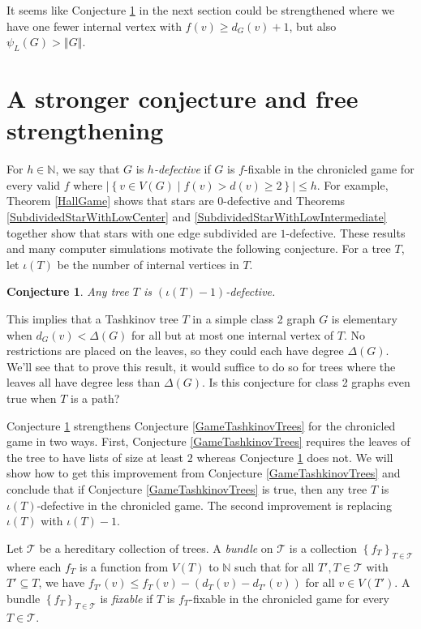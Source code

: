 \documentclass[12pt,reqno]{amsart}
\theoremstyle{plain}
\newtheorem{conj}[thm]{Conjecture}
\theoremstyle{definition}
\theoremstyle{remark}
\newcommand{\fancy}[1]{\mathcal{#1}}
\newcommand{\IN}{\mathbb{N}}
\newcommand{\set}[1]{\left\{ #1 \right\}}
\newcommand{\setb}[3]{\left\{ #1 \in #2 \mid #3 \right\}}
\newcommand{\card}[1]{\left|#1\right|}
\newcommand{\size}[1]{\left\Vert#1\right\Vert}
\newcommand{\parens}[1]{\left( #1 \right)}
\newcommand{\T}{\fancy{T}}
\begin{document}
It seems like Conjecture \ref{OneDefectiveConjecture} in the next section could be strengthened where we have one fewer internal vertex with $f(v) \ge d_G(v) + 1$, but also $\psi_L(G) > \size{G}$. 

\section{A stronger conjecture and free strengthening}
For $h \in \IN$, we say that $G$ is \emph{$h$-defective} if $G$ is $f$-fixable in the chronicled game for every valid $f$ where $\card{\setb{v}{V(G)}{f(v) > d(v) \ge 2}} \le h$.  For example, Theorem \ref{HallGame} shows that stars are $0$-defective and Theorems \ref{SubdividedStarWithLowCenter} and \ref{SubdividedStarWithLowIntermediate} together show that stars with one edge subdivided are $1$-defective.  These results and many computer simulations motivate the following conjecture.  For a tree $T$, let $\iota(T)$ be the number of internal vertices in $T$.

\begin{conj}\label{OneDefectiveConjecture}
Any tree $T$ is $(\iota(T) - 1)$-defective.
\end{conj}

This implies that a Tashkinov tree $T$ in a simple class 2 graph $G$ is elementary when $d_G(v) < \Delta(G)$ for all but at most one internal vertex of $T$.   No restrictions are placed on the leaves, so they could each have degree $\Delta(G)$.  We'll see that to prove this result, it would suffice to do so for trees where the leaves all have degree less than $\Delta(G)$.  Is this conjecture for class 2 graphs even true when $T$ is a path? 

Conjecture \ref{OneDefectiveConjecture} strengthens Conjecture \ref{GameTashkinovTrees} for the chronicled game in two ways.  First, Conjecture \ref{GameTashkinovTrees} requires the leaves of the tree to have lists of size at least $2$ whereas Conjecture \ref{OneDefectiveConjecture} does not.  We will show how to get this improvement from Conjecture \ref{GameTashkinovTrees} and conclude that if Conjecture \ref{GameTashkinovTrees} is true, then any tree $T$ is $\iota(T)$-defective in the chronicled game.  The second improvement is replacing $\iota(T)$ with $\iota(T) - 1$.

Let $\T$ be a hereditary collection of trees.  A \emph{bundle} on $\T$ is a collection $\set{f_T}_{T \in \T}$ where each $f_T$ is a function from $V(T)$ to $\IN$ such that for all $T', T \in \T$ with $T' \subseteq T$, we have $f_{T'}(v) \le f_T(v) - \parens{d_T(v) - d_{T'}(v)}$ for all $v \in V(T')$.  A bundle $\set{f_T}_{T \in \T}$ is \emph{fixable} if $T$ is $f_T$-fixable in the chronicled game for every $T \in \T$.
\end{document}
